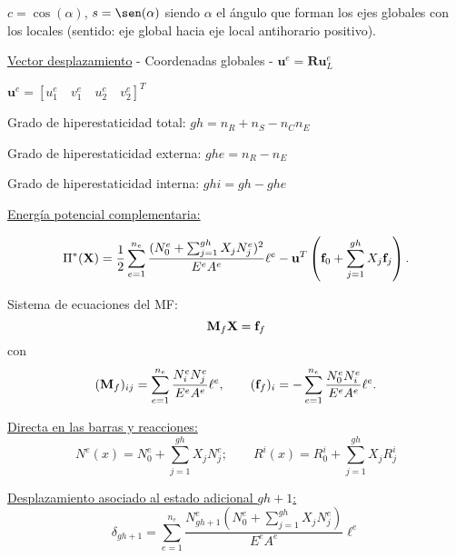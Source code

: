 \vspace{-0.2cm}
$c=\cos(\alpha)$, $s=\sen(\alpha)$ siendo $\alpha$ el ángulo que forman los ejes globales con los locales (sentido: eje global hacia eje local antihorario positivo).

\vspace{0.3cm}
\underline{Vector desplazamiento} - Coordenadas globales - $\textbf{u}^e=\textbf{R} \textbf{u}_ L^e$

\vspace{0.3cm}
$\textbf{u}^e=[u_1^e \quad v_1^e  \quad u_2^e \quad v_2^e]^T$ \centering


\begin{center}
\end{center}


Grado de hiperestaticidad total: $gh=n_R + n_S - n_C n_E$\raggedright

Grado de hiperestaticidad externa: $ghe=n_R - n_E$

Grado de hiperestaticidad interna: $ghi=gh - ghe$

\vspace{0.3cm}
\underline{Energía potencial complementaria:}\raggedright

$$
\Pi^* ({\bf X}) = \frac{1}{2}  \sum_{e=1}^{n_e} \frac{(N_0^e + \sum_{j=1}^{gh} X_j N_j^e)^2}{E^e A^e} \ell^e - {\bf u}^T \left( {\bf f}_0 +  \sum_{j=1}^{gh} X_j {\bf f}_j \right).
$$


Sistema de ecuaciones del MF:
$$
{\bf M}_f {\bf X} = {\bf f}_f
$$
%
con
$$
({\bf M}_f)_{ij} =  \sum_{e=1}^{n_e} \frac{N_i^e N_j^e }{E^e A^e} \ell^e,
\qquad
({\bf f}_f)_{i} =  - \sum_{e=1}^{n_e} \frac{N_0^e N_i^e }{E^e A^e} \ell^e.
$$

\underline{Directa en las barras y reacciones:}
$$
N^e (x)=N_0^e +  \sum_{j=1}^{gh} X_j N_j^e ;
\qquad
R^i(x)=R_0^i +  \sum_{j=1}^{gh} X_j R_j^i
$$

\underline{Desplazamiento asociado al estado adicional $gh+1$:}
$$
\delta_{gh+1}= \sum_{e=1}^{n_e} \frac{N_{gh+1}^e (N_0^e + \sum_{j=1}^{gh} X_j N_j^e)}{E^e A^e} \ell^e 
$$

\begin{center}
\end{center}

\begin{center}
	\def\svgwidth{0.85\textwidth}
	
\end{center}

